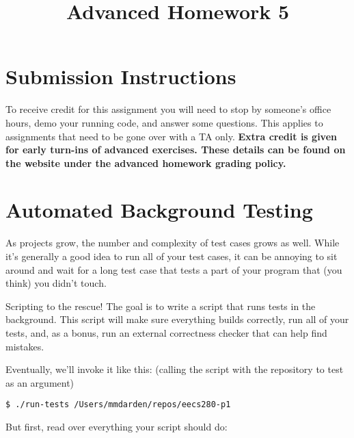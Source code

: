 \documentclass{article}
\begin{document}
\fancyfoot[C]{\color{gray} \thepage~/~\pageref*{LastPage}}
\pagestyle{fancyplain}

\title{\textbf{Advanced Homework 5\\}}
\author{\textbf{\color{red}{Due: Wednesday, October 16th, 11:59PM (Hard Deadline)}}}
\date{}
\maketitle


\section*{Submission Instructions}
To receive credit for this assignment you will need to stop by someone's
office hours, demo your running code, and answer some questions. \textbf{\color{red}{Make sure
to check the office hour schedule as the real due date is at the last office
hours before the date listed above.}} This applies to assignments that need to be gone over with a TA only.
\textbf{Extra credit is given for early turn-ins of advanced exercises. These details can be found on the website under the advanced homework grading policy.}


\section{Automated Background Testing}

As projects grow, the number and complexity of test cases grows as well. While
it's generally a good idea to run all of your test cases, it can be annoying
to sit around and wait for a long test case that tests a part of your program
that (you think) you didn't touch.

\medskip
\noindent
Scripting to the rescue! The goal is to write a script that runs tests in the
background. This script will make sure everything builds correctly, run all of
your tests, and, as a bonus, run an external correctness checker that can help
find mistakes.

\medskip
\noindent
Eventually, we'll invoke it like this: (calling the script with the repository to test as an argument)
\begin{lstlisting}
$ ./run-tests /Users/mmdarden/repos/eecs280-p1
\end{lstlisting}

\noindent
But first, read over everything your script should do:
\end{document}
